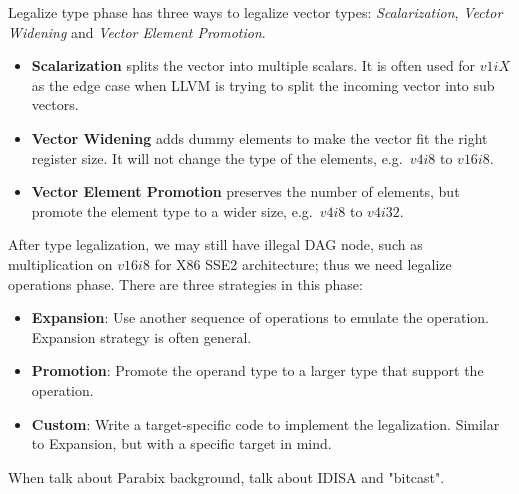 Legalize type phase has three ways to legalize vector types\cite{hybrid_simd_type_legalize}: \textit{Scalarization}, \textit{Vector Widening} and \textit{Vector Element Promotion}.

\begin{itemize}
    \item \textbf{Scalarization} splits the vector into multiple scalars. It is often used for $v1iX$ as the edge case when LLVM is trying to split the incoming vector into sub vectors.
    \item \textbf{Vector Widening} adds dummy elements to make the vector fit the right register size. It will not change the type of the elements, e.g.\ $v4i8$ to $v16i8$.
    \item \textbf{Vector Element Promotion} preserves the number of elements, but promote the element type to a wider size, e.g.\ $v4i8$ to $v4i32$.
\end{itemize}

After type legalization, we may still have illegal DAG node, such as multiplication on $v16i8$ for X86 SSE2 architecture; thus we need legalize operations phase. There are three strategies in this phase:

\begin{itemize}
    \item \textbf{Expansion}: Use another sequence of operations to emulate the operation. Expansion strategy is often general.
    \item \textbf{Promotion}: Promote the operand type to a larger type that support the operation.
    \item \textbf{Custom}: Write a target-specific code to implement the legalization. Similar to Expansion, but with a specific target in mind.
\end{itemize}

When talk about Parabix background, talk about IDISA and "bitcast".

